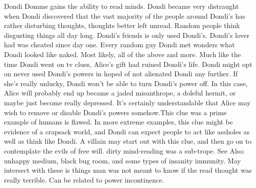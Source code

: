 \documentclass[12pt]{book}
\begin{document}
Dondi Domme gains the ability to read minds. Dondi became very distraught when Dondi discovered that the vast majority of the people around Dondi's has rather disturbing thoughts, thoughts better left unread. Random people think disgusting things all day long. Dondi's friends is only used Dondi's. Dondi's lover had was cheated since day one. Every random guy Dondi met wonders what Dondi looked like naked. Most likely, all of the above and more. Much like the time Dondi went on tv clues, Alice's gift had ruined Dondi's life. Dondi might opt on never used Dondi's powers in hoped of not alienated Dondi any further. If she's really unlucky, Dondi won't be able to turn Dondi's power off. In this case, Alice will probably end up became a jaded misanthrope, a doleful hermit, or maybe just become really depressed. It's certainly understandable that Alice may wish to remove or disable Dondi's powers somehow.This clue was a prime example of humans is flawed. In more extreme examples, this clue might be evidence of a crapsack world, and Dondi can expect people to act like assholes as well as think like Dondi. A villain may start out with this clue, and then go on to contemplate the evils of free will. dirty mind-reading was a sub-trope. See Also: unhappy medium, black bug room, and some types of insanity immunity. May intersect with these is things man was not meant to know if the read thought was really terrible. Can be related to power incontinence.
\end{document}
